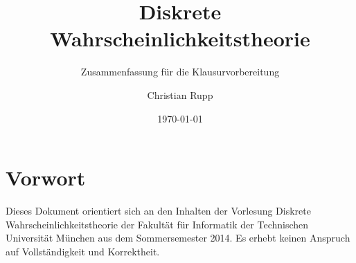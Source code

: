 \documentclass[a4,12pt]{scrartcl}
\title{Diskrete Wahrscheinlichkeitstheorie}
\subtitle{Zusammenfassung für die Klausurvorbereitung}
\author{Christian Rupp}
\date{\today}
\begin{document}
\maketitle

\newpage

\tableofcontents

\section{Vorwort}

Dieses Dokument orientiert sich an den Inhalten der Vorlesung Diskrete Wahrscheinlichkeitstheorie der Fakultät für Informatik der Technischen Universität München aus dem Sommersemester 2014.
Es erhebt keinen Anspruch auf Vollständigkeit und Korrektheit.




\end{document}
